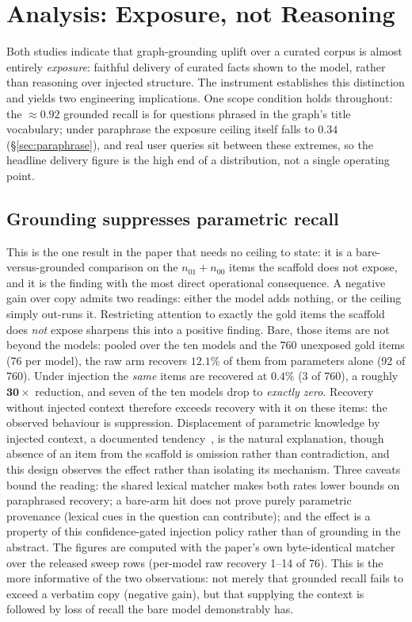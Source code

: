 \documentclass[10pt,twocolumn]{article}
\begin{document}
\section{Analysis: Exposure, not Reasoning}\label{sec:analysis}
Both studies indicate that graph-grounding uplift over a curated corpus is almost entirely \emph{exposure}: faithful delivery of curated facts shown to the model, rather than reasoning over injected structure. The instrument establishes this distinction and yields two engineering implications. One scope condition holds throughout: the $\approx0.92$ grounded recall is for questions phrased in the graph's title vocabulary; under paraphrase the exposure ceiling itself falls to $0.34$ (\S\ref{sec:paraphrase}), and real user queries sit between these extremes, so the headline delivery figure is the high end of a distribution, not a single operating point.

\subsection{Grounding suppresses parametric recall}\label{sec:suppression}
This is the one result in the paper that needs no ceiling to state: it is a bare-versus-grounded comparison on the $n_{01}+n_{00}$ items the scaffold does not expose, and it is the finding with the most direct operational consequence. A negative gain over copy admits two readings: either the model adds nothing, or the ceiling simply out-runs it. Restricting attention to exactly the gold items the scaffold does \emph{not} expose sharpens this into a positive finding. Bare, those items are not beyond the models: pooled over the ten models and the 760 unexposed gold items (76 per model), the raw arm recovers $\mathbf{12.1\%}$ of them from parameters alone (92 of 760). Under injection the \emph{same} items are recovered at $\mathbf{0.4\%}$ (3 of 760), a roughly $\mathbf{30\times}$ reduction, and seven of the ten models drop to \emph{exactly zero}. Recovery without injected context therefore exceeds recovery with it on these items: the observed behaviour is suppression. Displacement of parametric knowledge by injected context, a documented tendency~\cite{shi2023distracted,yoran2024robust,longpre2021entity}, is the natural explanation, though absence of an item from the scaffold is omission rather than contradiction, and this design observes the effect rather than isolating its mechanism. Three caveats bound the reading: the shared lexical matcher makes both rates lower bounds on paraphrased recovery; a bare-arm hit does not prove purely parametric provenance (lexical cues in the question can contribute); and the effect is a property of this confidence-gated injection policy rather than of grounding in the abstract. The figures are computed with the paper's own byte-identical matcher over the released sweep rows (per-model raw recovery 1--14 of 76). This is the more informative of the two observations: not merely that grounded recall fails to exceed a verbatim copy (negative gain), but that supplying the context is followed by loss of recall the bare model demonstrably has.
\end{document}
